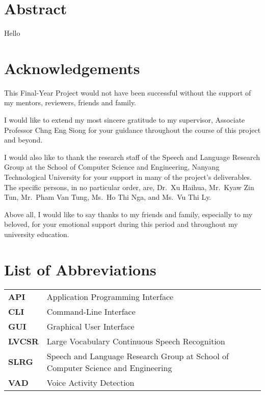 \chapter*{Abstract}
Hello
\newpage

\chapter*{Acknowledgements}
This Final-Year Project would not have been successful without the support
of my mentors, reviewers, friends and family.

I would like to extend my most sincere gratitude to my supervisor,
Associate Professor Chng Eng Siong for your guidance throughout
the course of this project and beyond.

I would also like to thank the research staff of the Speech
and Language Research Group at the School of Computer Science and Engineering,
Nanyang Technological University for your support in many of the project's
deliverables. The specific persons, in no particular order, are, Dr.\ Xu Haihua,
Mr.\ Kyaw Zin Tun, Mr.\ Pham Van Tung, Ms.\ Ho Thi Nga, and Ms.\ Vu Thi Ly.

Above all, I would like to say thanks to my friends and family, especially to my
beloved, for your emotional support during this period and throughout my university
education.
\newpage

\tableofcontents
\newpage

\listoffigures
\newpage

\listoftables
\newpage

\chapter*{List of Abbreviations}
\begin{tabu}{lX}
    \textbf{API} & Application Programming Interface \\
    \textbf{CLI} & Command-Line Interface \\
    \textbf{GUI} & Graphical User Interface \\
    \textbf{LVCSR} & Large Vocabulary Continuous Speech Recognition \\
    \textbf{SLRG} & Speech and Language Research Group at School of Computer
    Science and Engineering \\
    \textbf{VAD} & Voice Activity Detection
\end{tabu}
\newpage
